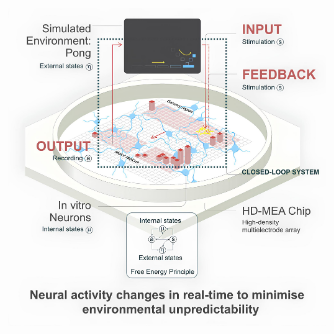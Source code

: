 \begin{figure}[!htbp]
    \centering
    \includegraphics[width=0.75\textwidth]{Img/dishbrain-absract.jpg}
    \label{fig:dishbrain-absract}
\end{figure}
